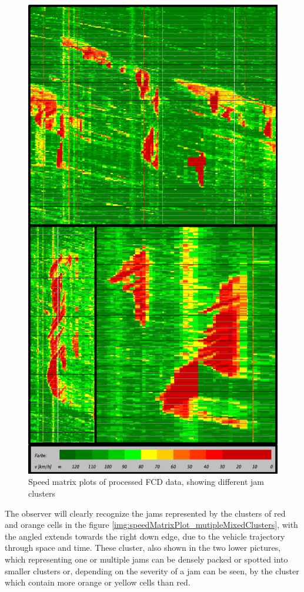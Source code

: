 \begin{figure}[ht]
	\centering
	\includegraphics[scale=0.7]{images/SpeedMatrixPlot_mutiple}
	\caption{Speed matrix plots of processed FCD data, showing different jam clusters}
	\label{img:speedMatrixPlot_mutipleMixedClusters}
\end{figure}

The observer will clearly recognize the jams represented by the clusters of red and orange cells in the figure \autoref{img:speedMatrixPlot_mutipleMixedClusters}, with the angled extends towards the right down edge, due to the vehicle trajectory through space and time. These cluster, also shown in the two lower pictures, which representing one or multiple jams can be densely packed or spotted into smaller clusters or, depending on the severity of a jam can be seen, by the cluster which contain more orange or yellow cells than red. 

